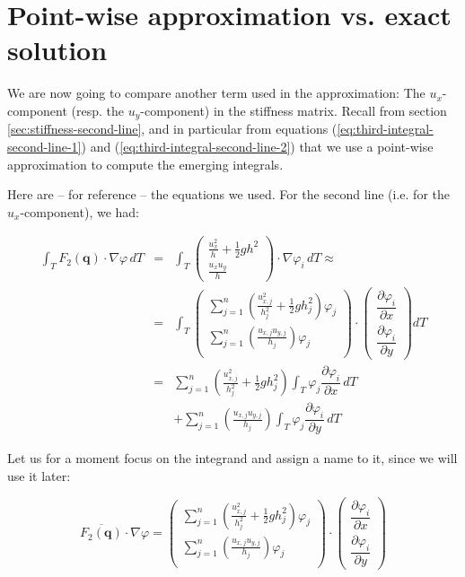 \documentclass{article}
\newcommand{\pd}[2]{\dfrac{\partial #1}{\partial #2}}
\renewcommand{\phi}{\varphi}
\begin{document}
\section{Point-wise approximation vs. exact solution}
\label{sec:point-wise-appr-vs-exact-solution-intro}

We are now going to compare another term used in the approximation: The $u_x$-component (resp. the $u_y$-component) in the stiffness matrix. Recall from section \ref{sec:stiffness-second-line}, and in particular from equations (\ref{eq:third-integral-second-line-1}) and (\ref{eq:third-integral-second-line-2}) that we use a point-wise approximation to compute the emerging integrals.

Here are -- for reference -- the equations we used. For the second line (i.e. for the $u_x$-component), we had:

\begin{eqnarray}
  \label{eq:third-integral-second-line-1-analysis-part}
  \int_T F_2(\mathbf{q}) \cdot \nabla \phi \, dT & = &
  \int_T
  \begin{pmatrix}
    \frac{u_x^2}{h} + \frac{1}{2} g h^2 \\ \frac{u_x u_y}{h}
  \end{pmatrix}
  \cdot \nabla \phi_i \, dT \approx \\
  \label{eq:third-integral-second-line-2-analysis-part}
  & = &
  \int_T
  \begin{pmatrix}
    \sum_{j=1}^n \left(\frac{u_{x,j}^2}{h_j^2} + \frac{1}{2} g h_j^2\right) \phi_j \\
    \sum_{j=1}^n \left(\frac{u_{x,j} u_{y,j}}{h_j}\right) \phi_j \\
  \end{pmatrix}
  \cdot
  \begin{pmatrix}
    \pd{\phi_i}{x} \\
    \pd{\phi_i}{y}
  \end{pmatrix} dT \\
  & = & \nonumber \sum_{j=1}^n \left(\frac{u_{x,j}^2}{h_j^2} + \frac{1}{2} g h_j^2\right) \int_T \phi_j \pd{\phi_i}{x} \, dT \\
  & {} & + \nonumber \sum_{j=1}^n \left(\frac{u_{x,j} u_{y,j}}{h_j}\right) \int_T \phi_j \pd{\phi_i}{y} \, dT 
\end{eqnarray}

Let us for a moment focus on the integrand and assign a name to it, since we will use it later:

\begin{equation}
  \label{eq:point-wise-approx-result-second-line}
  \overline{F_2(\mathbf{q})} \cdot \nabla \phi =
  \begin{pmatrix}
    \sum_{j=1}^n \left(\frac{u_{x,j}^2}{h_j^2} + \frac{1}{2} g h_j^2\right) \phi_j \\
    \sum_{j=1}^n \left(\frac{u_{x,j} u_{y,j}}{h_j}\right) \phi_j \\
  \end{pmatrix}
  \cdot
  \begin{pmatrix}
    \pd{\phi_i}{x} \\
    \pd{\phi_i}{y}
  \end{pmatrix}
\end{equation}
\end{document}
